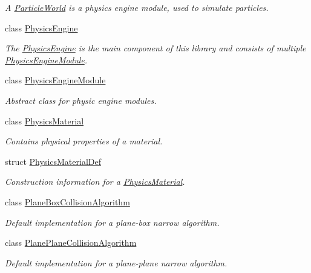 \begin{DoxyCompactItemize}
\begin{DoxyCompactList}\small\item\em A \mbox{\hyperlink{classr3_1_1_particle_world}{Particle\+World}} is a physics engine module, used to simulate particles. \end{DoxyCompactList}\item 
class \mbox{\hyperlink{classr3_1_1_physics_engine}{Physics\+Engine}}
\begin{DoxyCompactList}\small\item\em The \mbox{\hyperlink{classr3_1_1_physics_engine}{Physics\+Engine}} is the main component of this library and consists of multiple \mbox{\hyperlink{classr3_1_1_physics_engine_module}{Physics\+Engine\+Module}}. \end{DoxyCompactList}\item 
class \mbox{\hyperlink{classr3_1_1_physics_engine_module}{Physics\+Engine\+Module}}
\begin{DoxyCompactList}\small\item\em Abstract class for physic engine modules. \end{DoxyCompactList}\item 
class \mbox{\hyperlink{classr3_1_1_physics_material}{Physics\+Material}}
\begin{DoxyCompactList}\small\item\em Contains physical properties of a material. \end{DoxyCompactList}\item 
struct \mbox{\hyperlink{structr3_1_1_physics_material_def}{Physics\+Material\+Def}}
\begin{DoxyCompactList}\small\item\em Construction information for a \mbox{\hyperlink{classr3_1_1_physics_material}{Physics\+Material}}. \end{DoxyCompactList}\item 
class \mbox{\hyperlink{classr3_1_1_plane_box_collision_algorithm}{Plane\+Box\+Collision\+Algorithm}}
\begin{DoxyCompactList}\small\item\em Default implementation for a plane-\/box narrow algorithm. \end{DoxyCompactList}\item 
class \mbox{\hyperlink{classr3_1_1_plane_plane_collision_algorithm}{Plane\+Plane\+Collision\+Algorithm}}
\begin{DoxyCompactList}\small\item\em Default implementation for a plane-\/plane narrow algorithm. \end{DoxyCompactList}\item 

\end{DoxyCompactItemize}
